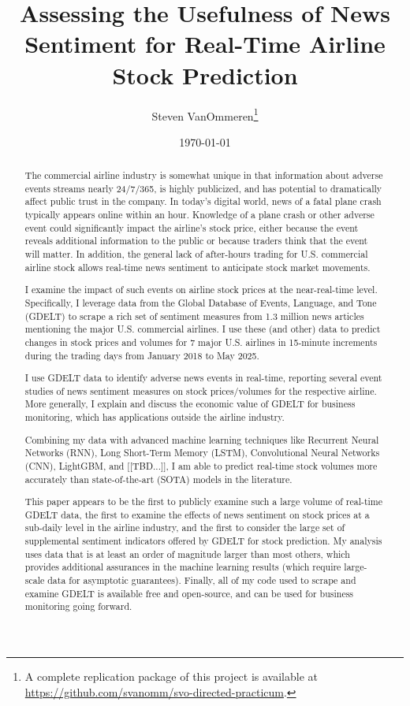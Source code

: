 \documentclass[12pt]{article}
\begin{document}
\title{Assessing the Usefulness of News Sentiment for Real-Time Airline Stock Prediction}
\author{Steven VanOmmeren\thanks{A complete replication package of this project is available at \url{https://github.com/svanomm/svo-directed-practicum}.}}
\date{\today}
\maketitle
\begin{abstract}
\noindent
    The commercial airline industry is somewhat unique in that information about adverse events streams nearly 24/7/365, is highly publicized, and has potential to dramatically affect public trust in the company. In today's digital world, news of a fatal plane crash typically appears online within an hour. Knowledge of a plane crash or other adverse event could significantly impact the airline's stock price, either because the event reveals additional information to the public or because traders think that the event will matter. In addition, the general lack of after-hours trading for U.S. commercial airline stock allows real-time news sentiment to anticipate stock market movements.
    
    I examine the impact of such events on airline stock prices at the near-real-time level. Specifically, I leverage data from the Global Database of Events, Language, and Tone (GDELT) to scrape a rich set of sentiment measures from 1.3 million news articles mentioning the major U.S. commercial airlines. I use these (and other) data to predict changes in stock prices and volumes for 7 major U.S. airlines in 15-minute increments during the trading days from January 2018 to May 2025.

    I use GDELT data to identify adverse news events in real-time, reporting several event studies of news sentiment measures on stock prices/volumes for the respective airline. More generally, I explain and discuss the economic value of GDELT for business monitoring, which has applications outside the airline industry. 

    Combining my data with advanced machine learning techniques like Recurrent Neural Networks (RNN), Long Short-Term Memory (LSTM), Convolutional Neural Networks (CNN), LightGBM, and [[TBD...]], I am able to predict real-time stock volumes more accurately than state-of-the-art (SOTA) models in the literature. 

    This paper appears to be the first to publicly examine such a large volume of real-time GDELT data, the first to examine the effects of news sentiment on stock prices at a sub-daily level in the airline industry, and the first to consider the large set of supplemental sentiment indicators offered by GDELT for stock prediction. My analysis uses data that is at least an order of magnitude larger than most others, which provides additional assurances in the machine learning results (which require large-scale data for asymptotic guarantees). Finally, all of my code used to scrape and examine GDELT is available free and open-source, and can be used for business monitoring going forward.
\end{abstract}
\doublespacing
\end{document}
